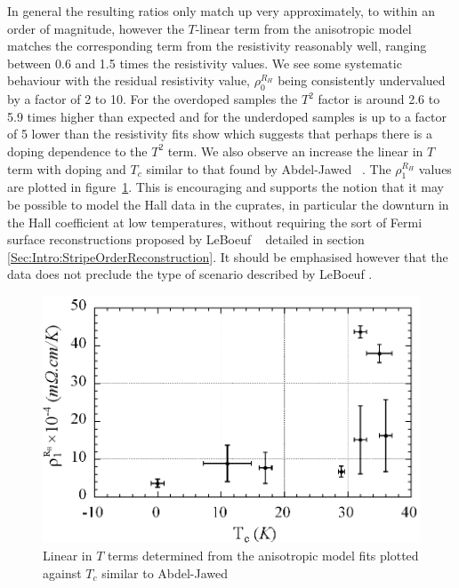 In general the resulting ratios only match up very approximately, to within an order of magnitude, however the $T$-linear term from the anisotropic model matches the corresponding term from the resistivity reasonably well, ranging between 0.6 and 1.5 times the resistivity values. We see some systematic behaviour with the residual resistivity value, $\rho_0^{R_H}$ being consistently undervalued by a factor of 2 to 10. For the overdoped samples the $T^2$ factor is around 2.6 to 5.9 times higher than expected and for the underdoped samples is up to a factor of 5 lower than the resistivity fits show which suggests that perhaps there is a doping dependence to the $T^2$ term. We also observe an increase the linear in $T$ term with doping and $T_c$ similar to that found by Abdel-Jawed \etal~\cite{Abdel-Jawad2007}. The $\rho_1^{R_H}$ values are plotted in figure~\ref{Fig:ResH:G1ScalingTc}. This is encouraging and supports the notion that it may be possible to model the Hall data in the cuprates, in particular the downturn in the Hall coefficient at low temperatures, without requiring the sort of Fermi surface reconstructions proposed by LeBoeuf \etal~\cite{LeBoeuf2011} detailed in section \ref{Sec:Intro:StripeOrderReconstruction}. It should be emphasised however that the data does not preclude the type of scenario described by LeBoeuf \etal.
\begin{figure}[htbp]
    \begin{center}
        \includegraphics[scale=0.7]{Chapter-HallBSCO/Figures/G1ScalingTc/G1ScalingTc}
        \caption{Linear in $T$ terms determined from the anisotropic model fits plotted against $T_c$ similar to Abdel-Jawed \etal~\cite{Abdel-Jawad2007}}
        \label{Fig:ResH:G1ScalingTc}
    \end{center}
\end{figure}


